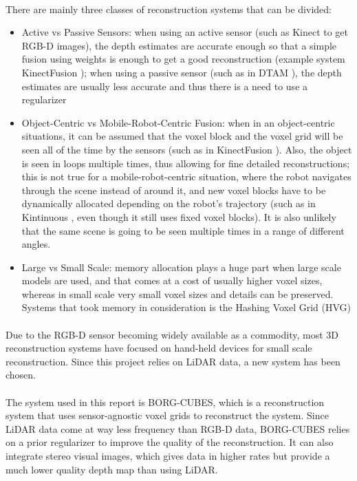 \documentclass[11pt]{article}
\begin{document}
	\paragraph{}
	There are mainly three classes of reconstruction systems that can be divided:
	\begin{itemize}
		\item Active vs Passive Sensors: when using an active sensor (such as Kinect to get RGB-D images), the depth estimates are accurate enough so that a simple fusion using weights is enough to get a good reconstruction (example system KinectFusion \cite{kinectfusion}); when using a passive sensor (such as in DTAM \cite{DTAM}), the depth estimates are usually less accurate and thus there is a need to use a regularizer
		\item Object-Centric vs Mobile-Robot-Centric Fusion: when in an object-centric situations, it can be assumed that the voxel block and the voxel grid will be seen all of the time by the sensors (such as in KinectFusion \cite{kinectfusion}). Also, the object is seen in loops multiple times, thus allowing for fine detailed reconstructions; this is not true for a mobile-robot-centric situation, where the robot navigates through the scene instead of around it, and new voxel blocks have to be dynamically allocated depending on the robot's trajectory (such as in Kintinuous \cite{kintinuous}, even though it still uses fixed voxel blocks). It is also unlikely that the same scene is going to be seen multiple times in a range of different angles.
		\item Large vs Small Scale: memory allocation plays a huge part when large scale models are used, and that comes at a cost of usually higher voxel sizes, whereas in small scale very small voxel sizes and details can be preserved. Systems that took memory in consideration is the Hashing Voxel Grid (HVG) \cite{HVG}
	\end{itemize}
	
	\paragraph{}
	Due to the RGB-D sensor becoming widely available as a commodity, most 3D reconstruction systems have focused on hand-held devices for small scale reconstruction. Since this project relies on LiDAR data, a new system has been chosen.	
	
	\paragraph{}
	The system used in this report is BORG-CUBES, which is a reconstruction system that uses sensor-agnostic voxel grids to reconstruct the system. Since LiDAR data come at way less frequency than RGB-D data, BORG-CUBES relies on a prior regularizer to improve the quality of the reconstruction. It can also integrate stereo visual images, which gives data in higher rates but provide a much lower quality depth map than using LiDAR.
	
\end{document}
